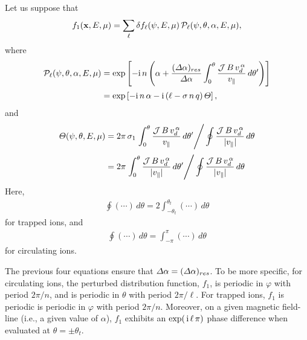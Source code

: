 \documentclass[12pt,prb,aps,notitlepage]{revtex4-1}
\begin{document}
 Let us suppose that
 \begin{equation}\label{e83}
 f_1({\bf x},E,\mu)=\sum_\ell \delta f_{\ell}(\psi,E,\mu)\,{\cal P}_{\ell}(\psi,\theta,\alpha,E,\mu),
 \end{equation}
 where
 \begin{align}
 {\cal P}_\ell(\psi,\theta,\alpha,E,\mu)& = \exp\left[-{\rm i}\,n\left(\alpha + \frac{({\mit\Delta}\alpha)_{res}}{{\mit\Delta}\alpha}\int_0^\theta\frac{{\cal J}\,B\,v_d^{\,\alpha}}{v_\parallel}\, d\theta'\right)\right]\nonumber\\[0.5ex]
 & = \exp\left[-{\rm i}\,n\,\alpha -{\rm i}\,(\ell - \sigma\,n\,q)\,{\mit\Theta}\right],
 \end{align}
 and
 \begin{align}\label{e85}
 {\mit\Theta}(\psi,\theta,E,\mu)&=2\pi \,\sigma_1\left.\int_0^\theta\frac{{\cal J}\,B\,v_d^{\,\alpha}}{v_\parallel}\, d\theta' \right/
 \oint\frac{{\cal J}\,B\,v_d^{\,\alpha}}{|v_\parallel|}\,d\theta\nonumber\\[0.5ex]
 &= 2\pi \left.\int_0^\theta\frac{{\cal J}\,B\,v_d^{\,\alpha}}{|v_\parallel|}\, d\theta' \right/
 \oint\frac{{\cal J}\,B\,v_d^{\,\alpha}}{|v_\parallel|}\,d\theta
 \end{align}
 Here,
 \begin{align}
 \oint(\cdots)\,d\theta= 2\int_{-\theta_t}^{\theta_t}
 (\cdots)\,d\theta
 \end{align}
 for trapped ions, and 
 \begin{align}
 \oint(\cdots)\,d\theta= \int_{-\pi}^{\pi}
 (\cdots)\,d\theta
 \end{align}
 for circulating ions. 
 
 The previous four equations ensure that ${\mit\Delta}\alpha= ({\mit\Delta}\alpha)_{res}$. To be more specific, for circulating ions, the
 perturbed distribution function, $f_1$,   is periodic in $\varphi$ with period
 $2\pi/n$, and is periodic in $\theta$ with period $2\pi/\ell$. For trapped ions, $f_1$ is periodic is periodic in $\varphi$ with period
 $2\pi/n$. Moreover, on a given magnetic field-line (i.e., a given value of $\alpha$), $f_1$  exhibits an $\exp(\,{\rm i}\,\ell\,\pi)$ phase difference
 when evaluated at $\theta=\pm\theta_t$. 
 
\end{document}
